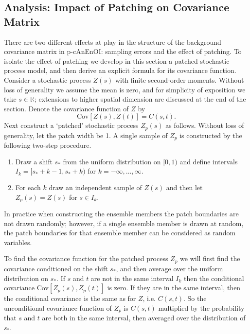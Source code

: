 \documentclass[final,3p]{elsarticle}
\theoremstyle{break}
\begin{document}
\subsection{Analysis: Impact of Patching on Covariance Matrix}\label{methods:cov}
There are two different effects at play in the structure of the background covariance matrix in p-cAnEnOI: sampling errors and the effect of patching.
To isolate the effect of patching we develop in this section a patched stochastic process model, and then derive an explicit formula for its covariance function.
Consider a stochastic process $Z(s)$ with finite second-order moments.
Without loss of generality we assume the mean is zero, and for simplicity of exposition we take $s\in\mathbb{R}$; extensions to higher spatial dimension are discussed at the end of the section.
Denote the covariance function of $Z$ by
\begin{equation}
    \text{Cov}[Z(s),Z(t)] = C(s,t).
\end{equation}
Next construct a `patched' stochastic process $Z_p(s)$ as follows.
Without loss of generality, let the patch width be 1.
A single sample of $Z_p$ is constructed by the following two-step procedure.
\begin{enumerate}
    \item Draw a shift $s_*$ from the uniform distribution on $[0,1)$ and define intervals $I_k = [s_*+k-1,s_*+k)$ for $k=-\infty,\ldots,\infty$.
    \item For each $k$ draw an independent sample of $Z(s)$ and then let $Z_p(s) = Z(s)$ for $s\in I_k$.
\end{enumerate}
In practice when constructing the ensemble members the patch boundaries are not drawn randomly; however, if a single ensemble member is drawn at random, the patch boundaries for that ensemble member can be considered as random variables.

To find the covariance function for the patched process $Z_p$ we will first find the covariance conditioned on the shift $s_*$, and then average over the uniform distribution on $s_*$.
If $s$ and $t$ are not in the same interval $I_k$ then the conditional covariance Cov$[Z_p(s),Z_p(t)]$ is zero.
If they are in the same interval, then the conditional covariance is the same as for $Z$, i.e. $C(s,t)$.
So the unconditional covariance function of $Z_p$ is $C(s,t)$ multiplied by the probability that $s$ and $t$ are both in the same interval, then averaged over the distribution of $s_*$.
\end{document}
